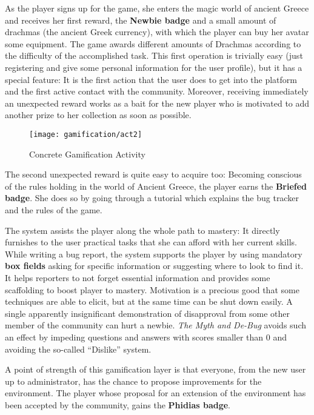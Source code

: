  As the player signs up for the game, she enters the magic world of ancient Greece and receives her first reward, the \textbf{Newbie badge} and a small amount of drachmas (the ancient Greek currency), with which the player can buy her avatar some equipment.
The game awards different amounts of Drachmas according to the difficulty of the accomplished task.
This first operation is trivially easy (just registering and give some personal information for the user profile), but it has a special feature: It is the first action that the user does to get into the platform and the first active contact with the community.
Moreover, receiving immediately an unexpected reward works as a bait for the new player who is motivated to add another prize to her collection as soon as possible.

\begin{figure}[t]
\centering
\texttt{[image: gamification/act2]}
\caption{Concrete Gamification Activity}
\label{fig-act2}
\end{figure}

 The second unexpected reward is quite easy to acquire too: Becoming conscious of the rules holding in the world of Ancient Greece, the player earns the \textbf{Briefed badge}.
She does so by going through a tutorial which explains the bug tracker and the rules of the game.

The system assists the player along the whole path to mastery: It directly furnishes to the user practical tasks that she can afford with her current skills.
While writing a bug report, the system supports the player by using mandatory \textbf{box fields} asking for specific information or suggesting where to look to find it.
It helps reporters to not forget essential information and provides some scaffolding to boost player to mastery.
Motivation is a precious good that some techniques are able to elicit, but at the same time can be shut down easily.
A single apparently insignificant demonstration of disapproval from some other member of the community can hurt a newbie.
\textit{The Myth and De-Bug} avoids such an effect by impeding questions and answers with scores smaller than 0 and avoiding the so-called ``Dislike'' system.

 A point of strength of this gamification layer is that everyone, from the new user up to administrator, has the chance to propose improvements for the  environment.
The player whose proposal for an extension of the environment has been accepted by the community, gains the \textbf{Phidias badge}.

